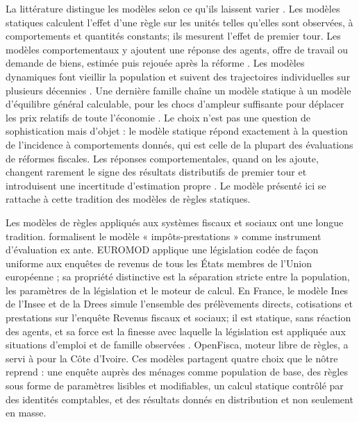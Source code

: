 \documentclass[11pt,a4paper]{article}
\begin{document}
La littérature distingue les modèles selon ce qu'ils laissent varier
\citep{bourguignonspadaro2006,figari2015}. Les modèles statiques calculent
l'effet d'une règle sur les unités telles qu'elles sont observées, à
comportements et quantités constants; ils mesurent l'effet de premier tour. Les
modèles comportementaux y ajoutent une réponse des agents, offre de travail ou
demande de biens, estimée puis rejouée après la réforme
\citep{creedyduncan2002,aabergecolombino2014}. Les modèles dynamiques font
vieillir la population et suivent des trajectoires individuelles sur plusieurs
décennies \citep{liodonoghue2013}. Une dernière famille chaîne un modèle
statique à un modèle d'équilibre général calculable, pour les chocs d'ampleur
suffisante pour déplacer les prix relatifs de toute l'économie
\citep{bourguignon2008,cockburn2014}. Le choix n'est pas une question de
sophistication mais d'objet : le modèle statique répond exactement à la question
de l'incidence à comportements donnés, qui est celle de la plupart des
évaluations de réformes fiscales. Les réponses comportementales, quand on les
ajoute, changent rarement le signe des résultats distributifs de premier tour
et introduisent une incertitude d'estimation propre
\citep{bourguignonspadaro2006}. Le modèle présenté ici se rattache à cette
tradition des modèles de règles statiques.

Les modèles de règles appliqués aux systèmes fiscaux et sociaux ont une longue
tradition. \citet{atkinsonsutherland1988} formalisent le modèle
« impôts-prestations » comme instrument d'évaluation ex ante. EUROMOD applique
une législation codée de façon uniforme aux enquêtes de revenus de tous les
États membres de l'Union européenne \citep{sutherlandfigari2013}; sa propriété
distinctive est la séparation stricte entre la population, les paramètres de la
législation et le moteur de calcul. En France, le modèle Ines de l'Insee et de
la Drees simule l'ensemble des prélèvements directs, cotisations et prestations
sur l'enquête Revenus fiscaux et sociaux; il est statique, sans réaction des
agents, et sa force est la finesse avec laquelle la législation est appliquée
aux situations d'emploi et de famille observées \citep{fredonsicsic2020}.
OpenFisca, moteur libre de règles, a servi à \citet{akim2020} pour la Côte
d'Ivoire. Ces modèles partagent quatre choix que le nôtre reprend : une enquête
auprès des ménages comme population de base, des règles sous forme de
paramètres lisibles et modifiables, un calcul statique contrôlé par des
identités comptables, et des résultats donnés en distribution et non seulement
en masse.
\end{document}
